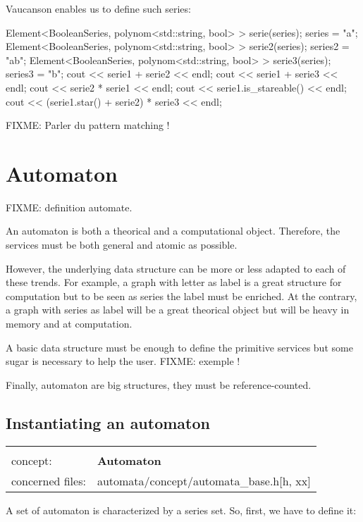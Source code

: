 \documentclass{article}
\begin{document}
\begin{code}
Vaucanson enables us to define such series:

\begin{code}
Element<BooleanSeries, polynom<std::string, bool> > serie(series);
series = "a";
Element<BooleanSeries, polynom<std::string, bool> > serie2(series);
series2 = "ab";
Element<BooleanSeries, polynom<std::string, bool> > serie3(series);
series3 = "b";
cout << serie1 + serie2 << endl;
cout << serie1 + serie3 << endl;
cout << serie2 * serie1 << endl;
cout << serie1.is_stareable() << endl;
cout << (serie1.star() + serie2) * serie3 << endl; 
\end{code}

FIXME: Parler du pattern matching !

\section{Automaton}

FIXME: definition automate.

An automaton is both a theorical and a computational object.
Therefore, the services must be both general and atomic as possible. 

However, the underlying data structure can be more or less adapted to each of these trends. For example, a graph with letter as label is a great structure for computation but to be seen as series the label must be enriched. At the contrary, a graph with series as label will be a great theorical object but will be heavy in memory and at computation.

A basic data structure must be enough to define the primitive services but some sugar is necessary to help the user. FIXME: exemple !

Finally, automaton are big structures, they must be reference-counted.

\subsection{Instantiating an automaton}

\begin{tabular}%
{ll}
\hline \\
concept: & \textbf{Automaton}  \\
concerned files: & automata/concept/automata\_base.h[h, xx] \\
\hline 
\end{tabular}

A set of automaton is characterized by a series set. So, first, we have to define it:


\end{code}
\end{document}
